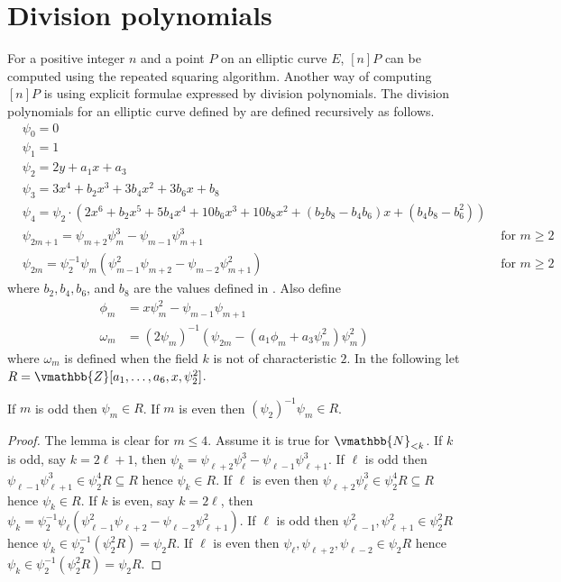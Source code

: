 \section{Division polynomials}
\label{section:div-poly}

For a positive integer $n$ and a point $P$ on an elliptic curve $E$, $[n]P$ can be computed using 
the repeated squaring algorithm. Another way of computing $[n]P$ is using explicit formulae 
expressed by division polynomials. The division polynomials for an elliptic curve defined by 
 are defined recursively as follows.
\begin{align*}
& \psi_0 = 0 \\
& \psi_1 = 1 \\
& \psi_2 = 2y + a_1x + a_3 \\
& \psi_3 = 3x^4 + b_2x^3 + 3b_4x^2 + 3b_6x + b_8 \\
& \psi_4 = \psi_2 \cdot (2x^6 + b_2x^5 + 5b_4x^4 + 10b_6x^3 + 10b_8x^2 + (b_2b_8 - b_4b_6)x + 
(b_4b_8 - b_6^2)) \\
& \psi_{2m + 1} = \psi_{m + 2}\psi_m^3 - \psi_{m - 1}\psi_{m + 1}^3 & \text{ for } m \ge 2\\
& \psi_{2m} = \psi_2^{-1}\psi_m(\psi_{m - 1}^2\psi_{m + 2} - \psi_{m - 2}\psi_{m + 1}^2) & \text{ 
for } m \ge 2
\end{align*}
where $b_2, b_4, b_6$, and $b_8$ are the values defined in . Also define
\begin{align*}
\phi_m &= x\psi_m^2 - \psi_{m - 1}\psi_{m + 1} \\
\omega_m &= (2\psi_m)^{-1}(\psi_{2m} - (a_1\phi_m + a_3\psi_m^2)\psi_m^2)
\end{align*}
where $\omega_m$ is defined when the field $k$ is not of characteristic $2$. In the following let $R 
= \vmathbb{Z}[a_1, \dots, a_6, x, \psi_2^2]$.
\begin{lemma}
\label{lemma:divpoly-in-R}
If $m$ is odd then $\psi_m \in R$. If $m$ is even then $(\psi_2)^{-1}\psi_m \in R$.
\end{lemma}
\begin{proof}
The lemma is clear for $m \le 4$. Assume it is true for $\vmathbb{N}_{< k}$. If $k$ is odd, say $k = 
2\ell + 1$, then $\psi_k = \psi_{\ell + 2}\psi_\ell^3 - \psi_{\ell - 1}\psi_{\ell + 1}^3$. If $\ell$ 
is odd then $\psi_{\ell - 1}\psi_{\ell + 1}^3 \in \psi_2^4R \subseteq R$ hence $\psi_k \in R$. If 
$\ell$ is even then $\psi_{\ell + 2}\psi_\ell^3 \in \psi_2^4R \subseteq R$ hence $\psi_k \in R$. If 
$k$ is even, say $k = 2\ell$, then $\psi_k = \psi_2^{-1}\psi_\ell(\psi_{\ell - 1}^2\psi_{\ell + 2} - 
\psi_{\ell - 2}\psi_{\ell + 1}^2)$. If $\ell$ is odd then $\psi_{\ell - 1}^2, \psi_{\ell + 1}^2 \in 
\psi_2^2R$ hence $\psi_k \in \psi_2^{-1}(\psi_2^2R) = \psi_2R$. If $\ell$ is even then $\psi_\ell, 
\psi_{\ell + 2}, \psi_{\ell - 2} \in \psi_2R$ hence $\psi_k \in \psi_2^{-1}(\psi_2^2R) = \psi_2R$.
\end{proof}
